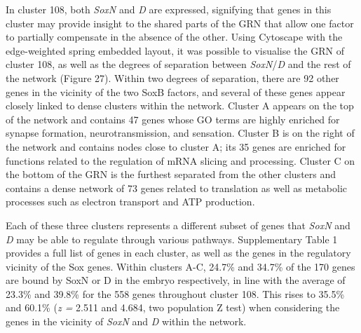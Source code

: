 \documentclass[withindex,glossary]{cam-thesis}
\begin{document}
In cluster 108, both \emph{SoxN} and \emph{D} are expressed, signifying
that genes in this cluster may provide insight to the shared parts of
the GRN that allow one factor to partially compensate in the absence of
the other. Using Cytoscape with the edge-weighted spring embedded
layout, it was possible to visualise the GRN of cluster 108, as well as
the degrees of separation between \emph{SoxN}/\emph{D} and the rest of
the network (Figure 27). Within two degrees of separation, there are 92
other genes in the vicinity of the two SoxB factors, and several of
these genes appear closely linked to dense clusters within the network.
Cluster A appears on the top of the network and contains 47 genes whose
GO terms are highly enriched for synapse formation, neurotransmission,
and sensation. Cluster B is on the right of the network and contains
nodes close to cluster A; its 35 genes are enriched for functions
related to the regulation of mRNA slicing and processing. Cluster C on
the bottom of the GRN is the furthest separated from the other clusters
and contains a dense network of 73 genes related to translation as well
as metabolic processes such as electron transport and ATP production.



Each of these three clusters represents a different subset of genes that
\emph{SoxN} and \emph{D} may be able to regulate through various
pathways. Supplementary Table 1 provides a full list of genes in each
cluster, as well as the genes in the regulatory vicinity of the Sox
genes. Within clusters A-C, 24.7\% and 34.7\% of the 170 genes are bound
by SoxN or D in the embryo respectively, in line with the average of
23.3\% and 39.8\% for the 558 genes throughout cluster 108. This rises
to 35.5\% and 60.1\% (\emph{z =} 2.511 and 4.684, two population Z test)
when considering the genes in the vicinity of \emph{SoxN} and \emph{D}
within the network.
\end{document}
